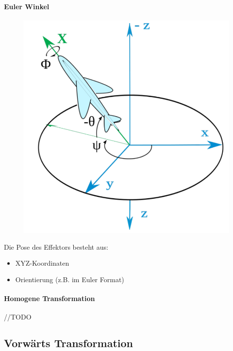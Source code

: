 \paragraph{Euler Winkel}
\begin{figure}[H]
	\begin{center}
		\includegraphics[scale=0.4]{resources/PNG/euler-winkel.PNG}
		\caption{}
		\label{fig:resoresources/PNG/euler-winkle.PNG}
	\end{center}
\end{figure}
Die Pose des Effektors besteht aus:
\begin{itemize}
	\item XYZ-Koordinaten
	\item Orientierung (z.B. im Euler Format)
\end{itemize}
\paragraph{Homogene Transformation}
//TODO
\subsection{Vorwärts Transformation}
